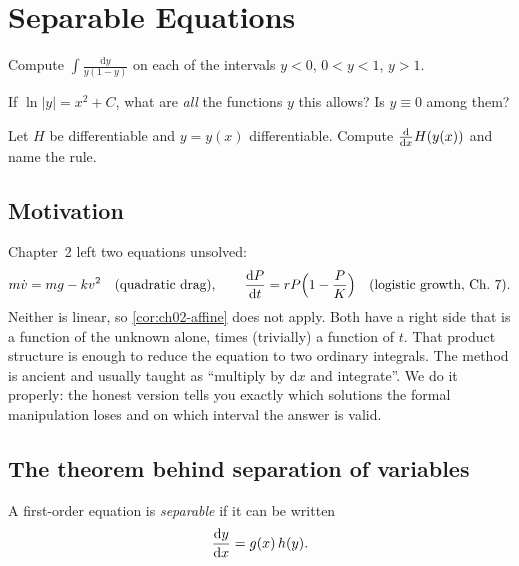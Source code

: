 \chapter{Separable Equations}\label{ch:ch03}

\begin{diagnostic}
  \item Compute $\displaystyle\int\frac{\mathrm{d}y}{y(1-y)}$ on each of the
        intervals $y<0$, $0<y<1$, $y>1$.
  \item If $\ln|y| = x^2 + C$, what are \emph{all} the functions $y$ this
        allows? Is $y\equiv 0$ among them?
  \item Let $H$ be differentiable and $y = y(x)$ differentiable. Compute
        $\frac{\mathrm{d}}{\mathrm{d}x}H(y(x))$ and name the rule.
\end{diagnostic}

\section{Motivation}\label{sec:ch03-motivation}

Chapter~2 left two equations unsolved:
\[
  m\dot v = mg - kv^2\quad\text{(quadratic drag)}, \qquad
  \frac{\mathrm{d}P}{\mathrm{d}t} = rP\Bigl(1 - \frac PK\Bigr)\quad\text{(logistic growth, Ch.~7)} .
\]
Neither is linear, so \cref{cor:ch02-affine} does not apply. Both have a
right side that is a function of the unknown alone, times (trivially) a
function of $t$. That product structure is enough to reduce the equation to
two ordinary integrals. The method is ancient and usually taught as
``multiply by $\mathrm{d}x$ and integrate''. We do it properly: the honest
version tells you exactly which solutions the formal manipulation loses and on
which interval the answer is valid.

\section{The theorem behind separation of variables}\label{sec:ch03-theory}

\begin{definition}[Separable]\label{def:ch03-separable}
A first-order equation is \emph{separable} if it can be written
\begin{equation}\label{eq:ch03-separable}
  \frac{\mathrm{d}y}{\mathrm{d}x} = g(x)\,h(y).
\end{equation}
\end{definition}

